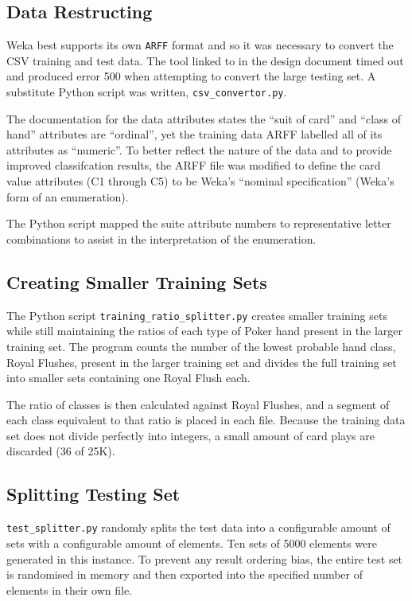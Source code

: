 \documentclass[10pt, a4paper]{article}
\begin{document}
\subsection*{Data Restructing}

Weka best supports its own \texttt{ARFF} format and so it was necessary to convert the CSV training \cite{trainingdata} and test \cite{testdata} data. The tool linked to in the design document \cite{arffconv} timed out and produced error 500 when attempting to convert the large testing set. A substitute Python script was written, \texttt{csv\_convertor.py}.

The documentation for the data attributes \cite{expattr} states the ``suit of card'' and ``class of hand'' attributes are ``ordinal'', yet the training data ARFF labelled all of its attributes as ``numeric''. To better reflect the nature of the data and to provide improved classifcation results, the ARFF file was modified to define the card value attributes (C1 through C5) to be Weka's ``nominal specification'' (Weka's form of an enumeration). 

The Python script mapped the suite attribute numbers to representative letter combinations to assist in the interpretation of the enumeration.

\subsection*{Creating Smaller Training Sets}

The Python script \texttt{training\_ratio\_splitter.py} creates smaller training sets while still maintaining the ratios of each type of Poker hand present in the larger training set. The program counts the number of the lowest probable hand class, Royal Flushes,  present in the larger training set and divides the full training set into smaller sets containing one Royal Flush each.

The ratio of classes is then calculated against Royal Flushes, and a segment of each class equivalent to that ratio is placed in each file. Because the training data set does not divide perfectly into integers, a small amount of card plays are discarded (36 of 25K). 

\subsection*{Splitting Testing Set}

\texttt{test\_splitter.py} randomly splits the test data into a configurable amount of sets with a configurable amount of elements. Ten sets of 5000 elements were generated in this instance. To prevent any result ordering bias, the entire test set is randomised in memory and then exported into the specified number of elements in their own file.
\end{document}
